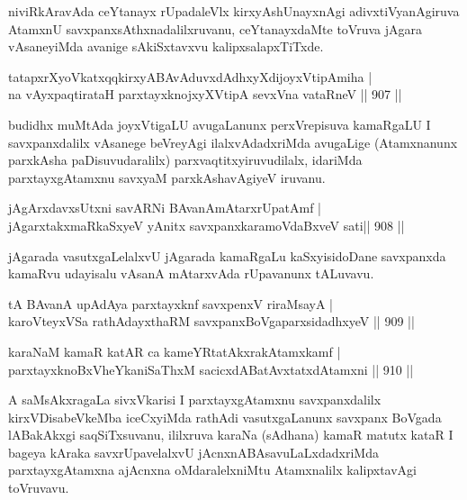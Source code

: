 \begin{artha}
niviRkAravAda ceYtanayx rUpadaleVlx kirxyAshUnayxnAgi adivxtiVyanAgiruva AtamxnU savxpanxsAthxnadalilxruvanu, ceYtanayxdaMte toVruva jAgara vAsaneyiMda avanige sAkiSxtavxvu kalipxsalapxTiTxde.
\end{artha}

\begin{shl}
tatapxrXyoVkatxqqkirxyABAvAduvxdAdhxyXdijoyxVtipAmiha | \\
na vAyxpaqtirataH parxtayxknojxyXVtipA sevxVna vataRneV \hfill||  907 ||  
\end{shl}

\begin{artha}
budidhx muMtAda joyxVtigaLU avugaLanunx perxVrepisuva kamaRgaLU I savxpanxdalilx vAsanege beVreyAgi ilalxvAdadxriMda avugaLige (Atamxnanunx parxkAsha paDisuvudaralilx) parxvaqtitxyiruvudilalx, idariMda parxtayxgAtamxnu savxyaM parxkAshavAgiyeV iruvanu.
\end{artha}


\begin{shl}
jAgArxdavxsUtxni savARNi BAvanAmAtarxrUpatAmf | \\
jAgarxtakxmaRkaSxyeV yAnitx savxpanxkaramoVdaBxveV sati\hfill ||  908 ||  
\end{shl}

\begin{artha}
jAgarada vasutxgaLelalxvU jAgarada kamaRgaLu kaSxyisidoDane savxpanxda kamaRvu udayisalu vAsanA mAtarxvAda rUpavanunx tALuvavu.
\end{artha}


\begin{shl}
tA BAvanA upAdAya parxtayxknf savxpenxV riraMsayA | \\
karoVteyxVSa rathAdayxthaRM savxpanxBoVgaparxsidadhxyeV \hfill||  909 ||  
\end{shl}
				
\begin{shl}
karaNaM kamaR katAR ca kameYRtatAkxrakAtamxkamf | \\
parxtayxknoBxVheYkaniSaThxM sacicxdABatAvxtatxdAtamxni \hfill||  910 ||  
\end{shl}

\begin{artha}
A saMsAkxragaLa sivxVkarisi I parxtayxgAtamxnu savxpanxdalilx kirxVDisabeVkeMba iceCxyiMda rathAdi vasutxgaLanunx savxpanx BoVgada lABakAkxgi saqSiTxsuvanu, ililxruva karaNa (sAdhana) kamaR matutx kataR I bageya kAraka savxrUpavelalxvU jAcnxnABAsavuLaLxdadxriMda parxtayxgAtamxna ajAcnxna oMdaralelxniMtu Atamxnalilx kalipxtavAgi toVruvavu.
\end{artha}

